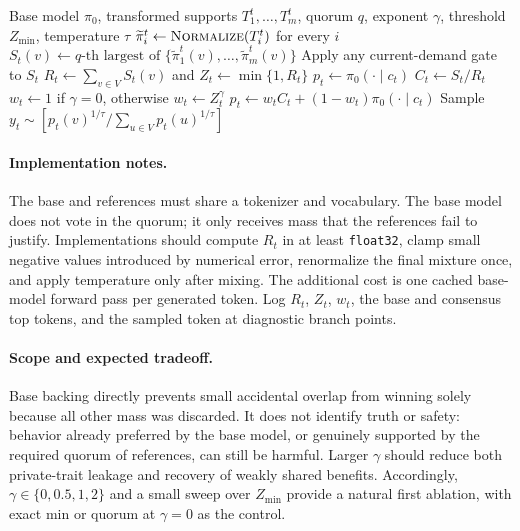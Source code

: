 \documentclass{article}
\begin{document}
\begin{algorithm}[H]
\caption{Base-Backed Relaxed Consensus Decoding}
\label{alg:base-backed-consensus}
\begin{algorithmic}[1]
\Require Base model $\pi_0$, transformed supports $T_1^t,\ldots,T_m^t$,
quorum $q$, exponent $\gamma$, threshold $Z_{\min}$, temperature $\tau$
\State $\widetilde{\pi}_i^t\gets\Call{Normalize}{T_i^t}$ for every $i$
\State $S_t(v)\gets q\text{-th largest of }
\{\widetilde{\pi}_1^t(v),\ldots,\widetilde{\pi}_m^t(v)\}$
\State Apply any current-demand gate to $S_t$
\State $R_t\gets\sum_{v\in V}S_t(v)$ and $Z_t\gets\min\{1,R_t\}$
    \State $p_t\gets\pi_0(\cdot\mid c_t)$
\Else
    \State $C_t\gets S_t/R_t$
    \State $w_t\gets 1$ if $\gamma=0$, otherwise $w_t\gets Z_t^\gamma$
    \State $p_t\gets w_t C_t+(1-w_t)\pi_0(\cdot\mid c_t)$
\EndIf
\State Sample $y_t\sim
\left[p_t(v)^{1/\tau}/\sum_{u\in V}p_t(u)^{1/\tau}\right]$
\end{algorithmic}
\end{algorithm}

\paragraph{Implementation notes.}
The base and references must share a tokenizer and vocabulary. The base model
does not vote in the quorum; it only receives mass that the references fail
to justify. Implementations should compute $R_t$ in at least
\texttt{float32}, clamp small negative values introduced by numerical error,
renormalize the final mixture once, and apply temperature only after mixing.
The additional cost is one cached base-model forward pass per generated
token. Log $R_t$, $Z_t$, $w_t$, the base and consensus top tokens, and the
sampled token at diagnostic branch points.

\paragraph{Scope and expected tradeoff.}
Base backing directly prevents small accidental overlap from winning solely
because all other mass was discarded. It does not identify truth or safety:
behavior already preferred by the base model, or genuinely supported by the
required quorum of references, can still be harmful. Larger $\gamma$ should
reduce both private-trait leakage and recovery of weakly shared benefits.
Accordingly, $\gamma\in\{0,0.5,1,2\}$ and a small sweep over $Z_{\min}$ provide
a natural first ablation, with exact min or quorum at $\gamma=0$ as the
control.
\end{document}
